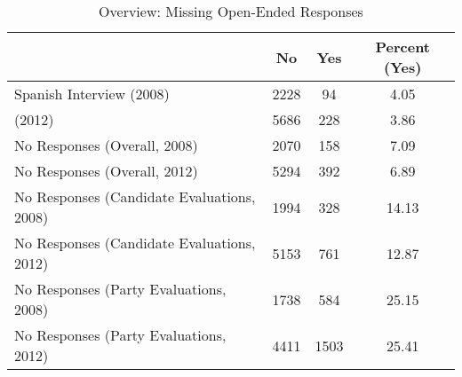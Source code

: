 \begin{table}[ht]
\centering
\begin{tabular}{lccc}
  \hline
 & No & Yes & Percent (Yes) \\ 
  \hline
Spanish Interview (2008) & 2228 & 94 & 4.05 \\ 
  (2012) & 5686 & 228 & 3.86 \\ 
  No Responses (Overall, 2008) & 2070 & 158 & 7.09 \\ 
  No Responses (Overall, 2012) & 5294 & 392 & 6.89 \\ 
  No Responses (Candidate Evaluations, 2008) & 1994 & 328 & 14.13 \\ 
  No Responses (Candidate Evaluations, 2012) & 5153 & 761 & 12.87 \\ 
  No Responses (Party Evaluations, 2008) & 1738 & 584 & 25.15 \\ 
  No Responses (Party Evaluations, 2012) & 4411 & 1503 & 25.41 \\ 
   \hline
\end{tabular}
\caption{Overview: Missing Open-Ended Responses} 
\end{table}
